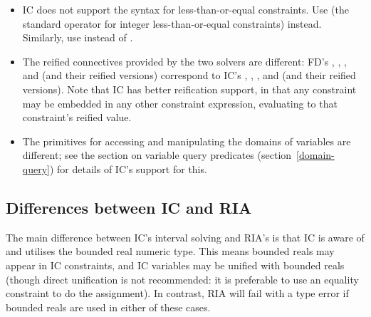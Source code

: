 \begin{itemize}
\item   IC does not support the 
        syntax for less-than-or-equal constraints.  Use
         (the standard
	\eclipse{} operator for integer less-than-or-equal constraints)
	instead.  Similarly, use
        instead of .

\item   The reified connectives provided by the two solvers are different:
        FD's
        ,
        ,
        ,
         and
        (and their reified versions)
        correspond to IC's
        ,
        ,
        ,
         and
        (and their reified versions).
        Note that IC has better reification support, in that any constraint
        may be embedded in any other constraint expression, evaluating to
        that constraint's reified value.

\item   The primitives for accessing and manipulating the domains of
        variables are different; see the section on variable query
	predicates (section~\ref{domain-query})
        for details of IC's support for this.

\end{itemize}


\subsection{Differences between IC and RIA}

The main difference between IC's interval solving and RIA's is that IC is
aware of and utilises the bounded real numeric type.
This means bounded reals may appear in IC constraints, and IC variables may
be unified with bounded reals (though direct unification is not recommended:
it is preferable to use an equality constraint to do the assignment).
In contrast, RIA will fail with a type error if bounded reals are used in
either of these cases.


